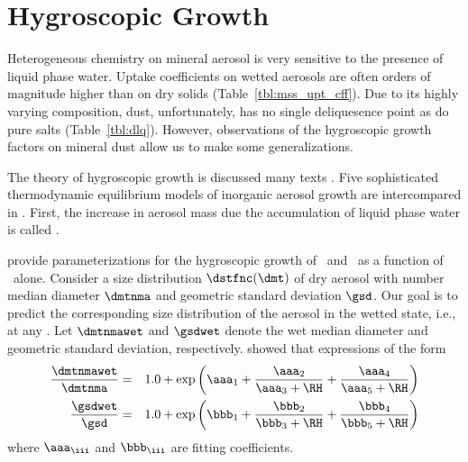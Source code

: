 \documentclass[12pt,twoside]{book}
\begin{document}
\section[Hygroscopic Growth]{Hygroscopic Growth}\label{sxn:hyg}
Heterogeneous chemistry on mineral aerosol is very sensitive to the
presence of liquid phase water. 
Uptake coefficients on wetted aerosols are often orders of magnitude
higher than on dry solids (Table~\ref{tbl:mss_upt_cff}).
Due to its highly varying composition, dust, unfortunately, has no
single deliquesence point as do pure salts (Table~\ref{tbl:dlq}).
However, observations of the hygroscopic growth factors on mineral
dust allow us to make some generalizations.

The theory of hygroscopic growth is discussed many texts
\cite[e.g.,][]{Han76,PrK78,RuD84,SeP97,WKB98}.
Five sophisticated thermodynamic equilibrium models of inorganic
aerosol growth are intercompared in \cite{ZSS00}.
First, the increase in aerosol mass due the accumulation of liquid
phase water is called .

\cite{WKB98} provide parameterizations for the hygroscopic growth of
\HdSOq\ and \NHqdSOq\ as a function of \RH\ alone.
Consider a size distribution $\dstfnc (\dmt)$ of dry aerosol with number
median diameter $\dmtnma$ and geometric standard deviation $\gsd$.
Our goal is to predict the corresponding size distribution of the
aerosol in the wetted state, i.e., at any \RH\@.  
Let $\dmtnmawet$ and $\gsdwet$ denote the wet median diameter and
geometric standard deviation, respectively.
\cite{WKB98} showed that expressions of the form 
\begin{eqnarray}
\frac{\dmtnmawet}{\dmtnma } & = & 1.0 +
\exp \left( \aaa_{1} + \frac{\aaa_{2}}{\aaa_{3} + \RH } + \frac{\aaa_{4}}{
\aaa_{5} + \RH } \right) \\
\frac{\gsdwet}{\gsd } & = & 1.0 +
\exp \left( \bbb_{1} + \frac{\bbb_{2}}{\bbb_{3} + \RH } + \frac{\bbb_{4}}{
\bbb_{5} + \RH } \right)
\label{eqn:hyr_grw_WKB98}
\end{eqnarray}
where $\aaa_{\iii}$ and $\bbb_{\iii}$ are fitting coefficients.
\end{document}
